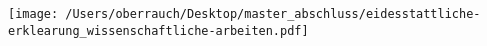 \chapter*{}
\thispagestyle{plain}

\texttt{[image: /Users/oberrauch/Desktop/master\_abschluss/eidesstattliche-erklearung\_wissenschaftliche-arbeiten.pdf]}
